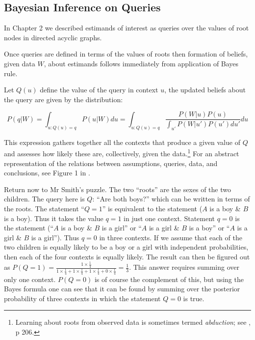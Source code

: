 \documentclass[12pt,]{book}
\let\rmarkdownfootnote\footnote%
\def\footnote{\protect\rmarkdownfootnote}
\begin{document}
\hypertarget{bayesian-inference-on-queries}{%
\subsection{Bayesian Inference on Queries}\label{bayesian-inference-on-queries}}

In Chapter 2 we described estimands of interest as queries over the values of root nodes in directed acyclic graphs.

Once queries are defined in terms of the values of roots then formation of beliefs, given data \(W\), about estimands follows immediately from application of Bayes rule.

Let \(Q(u)\) define the value of the query in context \(u\), the updated beliefs about the query are given by the distribution:

\[P(q | W) = \int_{u:Q(u) = q} P(u|W)du =  \int_{u:Q(u) = q} \frac{P(W|u)P(u)}{\int_{u'}P(W|u')P(u')du'}du\]

This expression gathers together all the contexts that produce a given value of \(Q\) and assesses how likely these are, collectively, given the data.\footnote{Learning about roots from observed data is sometimes termed \emph{abduction}; see \citet{pearl2009causality}, p 206.} For an abstract representation of the relations between assumptions, queries, data, and conclusions, see Figure 1 in \citet{pearl2012causal}.

Return now to Mr Smith's puzzle. The two ``roots'' are the sexes of the two children. The query here is \(Q\): ``Are both boys?'' which can be written in terms of the roots. The statement ``\(Q=1\)'' is equivalent to the statement (\(A\) is a boy \& \(B\) is a boy). Thus it takes the value \(q=1\) in just one context. Statement \(q=0\) is the statement (``\(A\) is a boy \& \(B\) is a girl'' or ``\(A\) is a girl \& \(B\) is a boy'' or ``\(A\) is a girl \& \(B\) is a girl''). Thus \(q=0\) in three contexts. If we assume that each of the two children is equally likely to be a boy or a girl with independent probabilities, then each of the four contexts is equally likely.
The result can then be figured out as \(P(Q=1) = \frac{1\times \frac{1}{4}}{1\times \frac{1}{4} + 1\times \frac{1}{4}+1\times \frac{1}{4}+0\times \frac{1}{4}} = \frac{1}{3}\). This answer requires summing over only one context. \(P(Q=0)\) is of course the complement of this, but using the Bayes formula one can see that it can be found by summing over the posterior probability of three contexts in which the statement \(Q=0\) is true.
\end{document}
